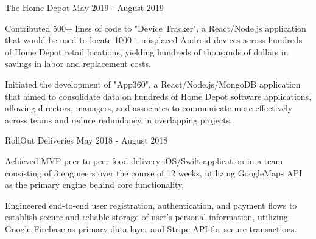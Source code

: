 \begin{cventries}
    \vspace{-2.0mm}
  \cventry
    {} %
    {The Home Depot } %
    {May 2019 - August 2019} %
    {} %
    {
        \vspace{-4.5mm}
      \begin{cvitems} %
        \item {Contributed 500+ lines of code to "Device Tracker", a React/Node.js application that would be used to locate 1000+ misplaced Android devices across hundreds of Home Depot retail locations, yielding hundreds of thousands of dollars in savings in labor and replacement costs.}
        \item {Initiated the development of "App360", a React/Node.js/MongoDB application that aimed to consolidate data on hundreds of Home Depot software applications, allowing directors, managers, and associates to communicate more effectively across teams and reduce redundancy in overlapping projects.}
      \end{cvitems}
    }

  \vspace{-1.5mm}
  \cventry
    {} %
    {RollOut Deliveries } %
    {May 2018 - August 2018} %
    {} %
    {
    \vspace{-4.5mm}
      \begin{cvitems} %
        \item {Achieved MVP peer-to-peer food delivery iOS/Swift application in a team consisting of 3 engineers over the course of 12 weeks, utilizing GoogleMaps API as the primary engine behind core functionality.}
        \item {Engineered end-to-end user registration, authentication, and payment flows to establish secure and reliable storage of user's personal information, utilizing Google Firebase as primary data layer and Stripe API for secure transactions.}
      \end{cvitems}
    }

\end{cventries}